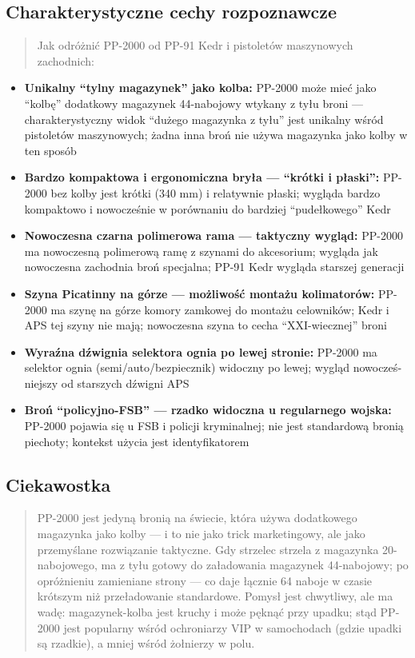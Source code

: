 \documentclass[12pt,oneside]{book}
\providecommand{\tightlist}{%
  \setlength{\itemsep}{0pt}\setlength{\parskip}{0pt}}
\begin{document}
\subsection{Charakterystyczne cechy
rozpoznawcze}\label{charakterystyczne-cechy-rozpoznawcze-112}

\begin{quote}
Jak odróżnić PP-2000 od PP-91 Kedr i pistoletów maszynowych zachodnich:
\end{quote}

\begin{itemize}
\tightlist
\item
  \textbf{Unikalny ``tylny magazynek'' jako kolba:} PP-2000 może mieć
  jako ``kolbę'' dodatkowy magazynek 44-nabojowy wtykany z tyłu broni
  --- charakterystyczny widok ``dużego magazynka z tyłu'' jest unikalny
  wśród pistoletów maszynowych; żadna inna broń nie używa magazynka jako
  kolby w ten sposób
\item
  \textbf{Bardzo kompaktowa i ergonomiczna bryła --- ``krótki i
  płaski'':} PP-2000 bez kolby jest krótki (340 mm) i relatywnie płaski;
  wygląda bardzo kompaktowo i nowocześnie w porównaniu do bardziej
  ``pudełkowego'' Kedr
\item
  \textbf{Nowoczesna czarna polimerowa rama --- taktyczny wygląd:}
  PP-2000 ma nowoczesną polimerową ramę z szynami do akcesorium; wygląda
  jak nowoczesna zachodnia broń specjalna; PP-91 Kedr wygląda starszej
  generacji
\item
  \textbf{Szyna Picatinny na górze --- możliwość montażu kolimatorów:}
  PP-2000 ma szynę na górze komory zamkowej do montażu celowników; Kedr
  i APS tej szyny nie mają; nowoczesna szyna to cecha ``XXI-wiecznej''
  broni
\item
  \textbf{Wyraźna dźwignia selektora ognia po lewej stronie:} PP-2000 ma
  selektor ognia (semi/auto/bezpiecznik) widoczny po lewej; wygląd
  nowocześ­niejszy od starszych dźwigni APS
\item
  \textbf{Broń ``policyjno-FSB'' --- rzadko widoczna u regularnego
  wojska:} PP-2000 pojawia się u FSB i policji kryminalnej; nie jest
  standardową bronią piechoty; kontekst użycia jest identyfikatorem
\end{itemize}

\subsection{Ciekawostka}\label{ciekawostka-112}

\begin{quote}
PP-2000 jest jedyną bronią na świecie, która używa dodatkowego magazynka
jako kolby --- i to nie jako trick marketingowy, ale jako przemyślane
rozwiązanie taktyczne. Gdy strzelec strzela z magazynka 20-nabojowego,
ma z tyłu gotowy do załadowania magazynek 44-nabojowy; po opróżnieniu
zamieniane strony --- co daje łącznie 64 naboje w czasie krótszym niż
przeładowanie standardowe. Pomysł jest chwytliwy, ale ma wadę:
magazynek-kolba jest kruchy i może pęknąć przy upadku; stąd PP-2000 jest
popularny wśród ochroniarzy VIP w samochodach (gdzie upadki są rzadkie),
a mniej wśród żołnierzy w polu.
\end{quote}
\end{document}
